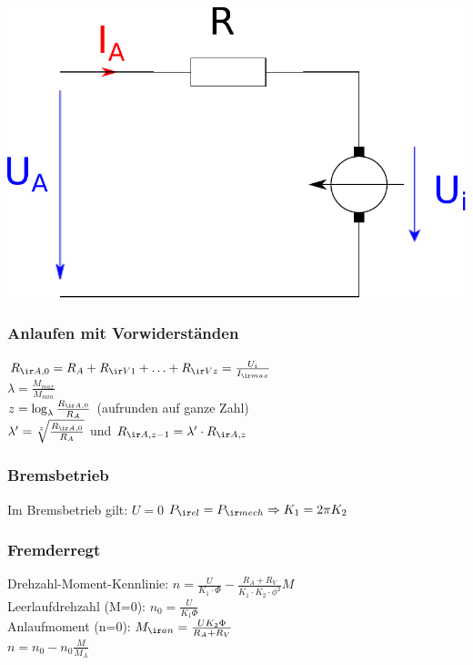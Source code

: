 \documentclass[european]{latex4ei_sheet}
\begin{document}
		\begin{center}
		\includegraphics[scale=.2]{./img/ersatzschaltbild_gleichstrommaschine.pdf}
		\end{center}
		
		\subsubsection{Anlaufen mit Vorwiderständen}
		$R_{\ir A,0} = R_A + R_{\ir V1} + \hdots + R_{\ir Vz} = \frac{U_i}{I_{\ir max}}$\\
		$\lambda = \frac{M_{max}}{M_{min}}$ \\
		$ z = \log_\lambda \frac{R_{\ir A,0}}{R_A}$ (aufrunden auf ganze Zahl)\\
		$\lambda' = \sqrt[z]{\frac{R_{\ir A,0}}{R_A}}$ und $R_{\ir A,z-1} = \lambda'\cdot R_{\ir A,z}$\\
		
		
		\subsubsection{Bremsbetrieb}
		Im Bremsbetrieb gilt: $U=0$ \quad $P_{\ir el}=P_{\ir mech} \Rightarrow K_1=2\pi K_2$
		
		\subsubsection{Fremderregt}
		Drehzahl-Moment-Kennlinie: $n = \frac{U}{ K_1 \cdot \Phi} - \frac{R_A+R_V}{K_1 \cdot K_2 \cdot \phi^2}M$\\

		Leerlaufdrehzahl (M=0): $n_0 = \frac{U}{K_1 \Phi}$ \\
		Anlaufmoment (n=0): $M_{\ir an} = \frac{U K_2 \Phi}{R_A+R_V}$ \\
		$n = n_0 - n_0 \frac{M}{M_A}$
		
\end{document}
